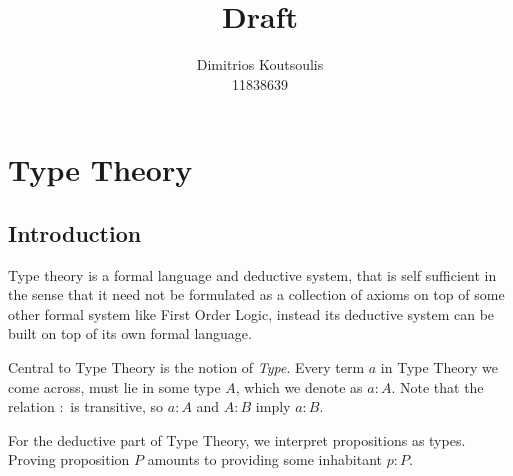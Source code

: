 \documentclass[12pt]{article}
\begin{document}
 
\title{Draft}%
\author{Dimitrios Koutsoulis\\ %
11838639} %
 
\maketitle
\section{Type Theory}
\subsection{Introduction}
Type theory is a formal language and deductive system, that is self sufficient in the sense that it need not be formulated as a collection of axioms on top of some other formal system like First Order Logic, instead its deductive system can be built on top of its own formal language. 

Central to Type Theory is the notion of \textit{Type}. Every term $a$ in Type Theory we come across, must lie in some type $A$, which we denote as $a : A$. Note that the relation $:$ is transitive, so $a : A$ and $A : B$ imply $a : B$. 

For the deductive part of Type Theory, we interpret propositions as types. Proving proposition $P$ amounts to providing some inhabitant $p : P$. 
\end{document}
